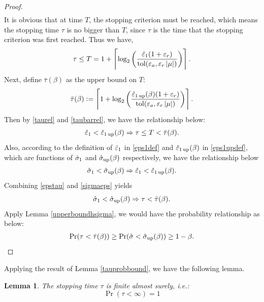 \documentclass{iitthesis}
\newtheorem{lemma}[theorem]{Lemma}
\begin{document}
\begin{proof}
\begin{align}
\end{align}
It is obvious that at time $T$, the stopping criterion must be reached, which means the stopping time $\tau$ is no bigger than $T$, since $\tau$ is the time that the stopping criterion was first reached. Thus we have,
\begin{align}\label{taurel}
\tau \le T=1+\left \lceil \log_{2} \left(\frac{\hat{\varepsilon}_{1}(1+\varepsilon_r)}{ \operatorname{tol}(\varepsilon_a,\varepsilon_r \left \lvert \mu \right \rvert)}\right) \right \rceil.
\end{align}
Next, define $\bar{\tau}(\beta)$ as the upper bound on $T$:
\begin{align}\label{taubarrel}
\bar{\tau}(\beta):= \left \lceil 1+\log_2 \left(\frac{\hat{\varepsilon}_{1\operatorname{up}}(\beta)(1+\varepsilon_r)}{ \operatorname{tol}(\varepsilon_a,\varepsilon_r \left \lvert \mu \right \rvert)}\right) \right \rceil.
\end{align}
Then by \eqref{taurel} and \eqref{taubarrel}, we have the relationship below:
\begin{align} \label{epstau}
 \hat{\varepsilon}_1 <\hat{\varepsilon}_{1\operatorname{up}}(\beta) \Rightarrow \tau \le T<\bar{\tau}(\beta).
\end{align}
Also, according to the definition of $\hat{\varepsilon}_1$ in \eqref{eps1def} and $\hat{\varepsilon}_{1\operatorname{up}}(\beta)$ in \eqref{eps1updef}, which are functions of $\hat{\sigma}_1$ and $\hat{\sigma}_{\operatorname{up}}(\beta)$ respectively, we have the relationship below
\begin{align}\label{sigmaeps}
 \hat{\sigma}_1 < \hat{\sigma}_{\operatorname{up}}(\beta) \Rightarrow \hat{\varepsilon}_1 < \hat{\varepsilon}_{1\operatorname{up}}(\beta).
\end{align}
Combining \eqref{epstau} and \eqref{sigmaeps} yields
$$\hat{\sigma}_1 < \hat{\sigma}_{\operatorname{up}}(\beta) \Rightarrow\tau <\bar{\tau}(\beta).$$
Apply Lemma \ref{upperboundhsigma}, we would have the probability relationship as below: 
\begin{align}
\Pr(\tau < \bar{\tau}(\beta)) \geq  \Pr(\hat{\sigma} < \hat{\sigma}_{\operatorname{up}}(\beta)) \geq 1-\beta.
\end{align}
\end{proof}
Applying the result of Lemma \ref{tauprobbound}, we have the following lemma.
\begin{lemma}\label{taufinite}
The stopping time $\tau$ is finite almost surely, i.e.:
$$\Pr(\tau < \infty) = 1$$
\end{lemma}
\end{document}
